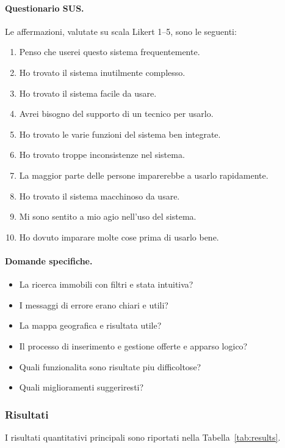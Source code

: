 \documentclass[a4paper,11pt]{article}
\begin{document}
\paragraph{Questionario SUS.}
Le affermazioni, valutate su scala Likert 1--5, sono le seguenti:
\begin{enumerate}
  \item Penso che userei questo sistema frequentemente.
  \item Ho trovato il sistema inutilmente complesso.
  \item Ho trovato il sistema facile da usare.
  \item Avrei bisogno del supporto di un tecnico per usarlo.
  \item Ho trovato le varie funzioni del sistema ben integrate.
  \item Ho trovato troppe inconsistenze nel sistema.
  \item La maggior parte delle persone imparerebbe a usarlo rapidamente.
  \item Ho trovato il sistema macchinoso da usare.
  \item Mi sono sentito a mio agio nell'uso del sistema.
  \item Ho dovuto imparare molte cose prima di usarlo bene.
\end{enumerate}

\paragraph{Domande specifiche.}
\begin{itemize}
  \item La ricerca immobili con filtri e stata intuitiva?
  \item I messaggi di errore erano chiari e utili?
  \item La mappa geografica e risultata utile?
  \item Il processo di inserimento e gestione offerte e apparso logico?
  \item Quali funzionalita sono risultate piu difficoltose?
  \item Quali miglioramenti suggeriresti?
\end{itemize}

\subsubsection{Risultati}
I risultati quantitativi principali sono riportati nella Tabella~\ref{tab:results}.
\end{document}
